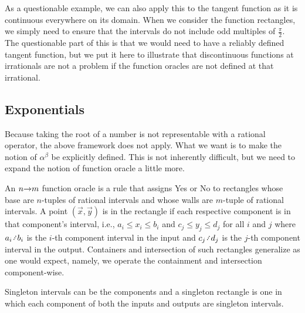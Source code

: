 \documentclass[12pt]{article}
\begin{document}
As a questionable example, we can also apply this to the tangent function as it is continuous everywhere on its domain. When we consider the function rectangles, we simply need to ensure that the intervals do not include odd multiples of $\frac{\pi}{2}$. The questionable part of this is that we would need to have a reliably defined tangent function, but we put it here to illustrate that discontinuous functions at irrationals are not a problem if the function oracles are not defined at that irrational. 

\subsection{Exponentials}

Because taking the root of a number is not representable with a rational operator, the above framework does not apply. What we want is to make the notion of $\alpha^{\beta}$ be explicitly defined. This is not inherently difficult, but we need to expand the notion of function oracle a little more.

An $n \mathord{\rightarrow} m$ function oracle is a rule that assigns Yes or No to rectangles whose base are $n$-tuples of rational intervals and whose walls are $m$-tuple of rational intervals. A point $(\vec{x}, \vec{y})$ is in the rectangle if each respective component is in that component's interval, i.e.,  $a_i \leq x_i \leq b_i$ and $c_j \leq y_j \leq d_j$ for all $i$ and $j$ where $a_i \lte b_i$ is the $i$-th component interval in the input and $c_j \lte d_j$ is the $j$-th component interval in the output. Containers and intersection of such rectangles generalize as one would expect, namely, we operate the containment and intersection component-wise. 

Singleton intervals can be the components and a singleton rectangle is one in which each component of both the inputs and outputs are singleton intervals. 
\end{document}
